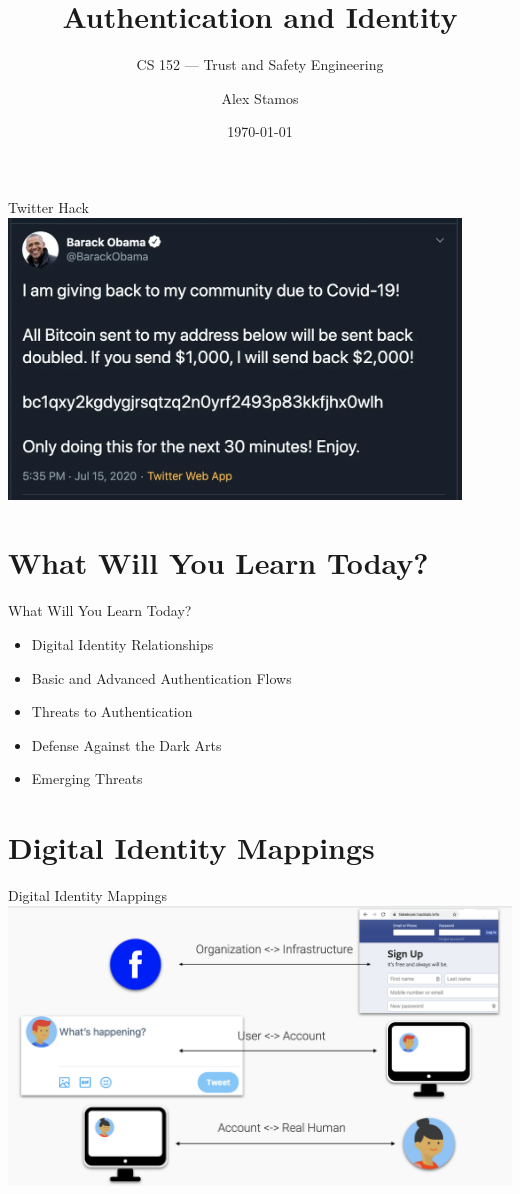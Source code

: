 \documentclass[nobackground,dvipsnames,table,aspectratio=169]{beamer}
\title{Authentication and Identity}
\subtitle{CS 152 --- Trust and Safety Engineering}
\author[A. Stamos]{Alex Stamos}
\institute[Stanford University]{Stanford Cyber Policy Center}
\date[2022]{\today}
\begin{document}
\begin{frame}
    \titlepage
\end{frame}

\begin{frame}{Twitter Hack}
    \centering
    \includegraphics[width=0.9\textwidth]{thanks-obama}
\end{frame}


\section{What Will You Learn Today?}

\begin{frame}{What Will You Learn Today?}
    \Large
    \begin{itemize}
        \item Digital Identity Relationships
        \item Basic and Advanced Authentication Flows
        \item Threats to Authentication
        \item Defense Against the Dark Arts
        \item Emerging Threats
    \end{itemize}
\end{frame}

\section{Digital Identity Mappings}

\begin{frame}{Digital Identity Mappings}
    \includegraphics[width=\textwidth]{digital-identity-mappings}
\end{frame}
\end{document}
